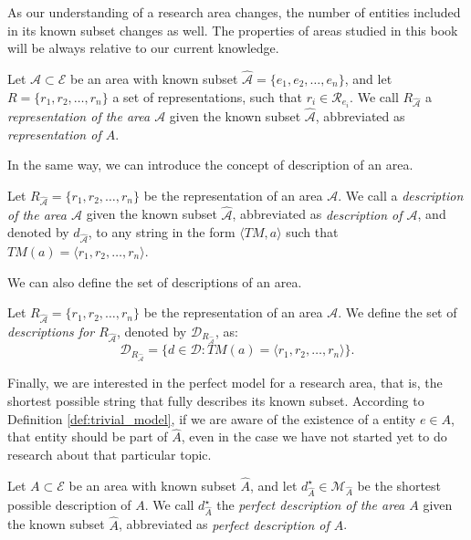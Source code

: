 As our understanding of a research area changes, the number of entities included in its known subset changes as well. The properties of areas studied in this book will be always relative to our current knowledge.

\begin{definition}
Let $\mathcal{A} \subset \mathcal{E}$ be an area with known subset $\hat{\mathcal{A}} = \{ e_1, e_2, \ldots, e_n \}$, and let  $R = \{ r_1, r_2, \ldots, r_n \}$ a set of representations, such that $r_i \in \mathcal{R}_{e_i}$. We call $R_{\hat{\mathcal{A}}}$ a \emph{representation of the area $\mathcal{A}$} given the known subset $\hat{\mathcal{A}}$, abbreviated as \emph{representation of $A$}.
\end{definition}

In the same way, we can introduce the concept of description of an area.

\begin{definition}
Let $R_{\hat{\mathcal{A}}} = \{ r_1, r_2, \ldots, r_n \}$ be the representation of an area $\mathcal{A}$. We call a \emph{description of the area $\mathcal{A}$} given the known subset $\hat{\mathcal{A}}$, abbreviated as \emph{description of $\mathcal{A}$}, and denoted by $d_{\hat{\mathcal{A}}}$, to any string in the form $\langle TM, a\rangle$ such that $TM(a) = \langle r_1, r_2, \ldots, r_n\rangle$.
\end{definition}

We can also define the set of descriptions of an area.

\begin{definition}
Let $R_{\hat{\mathcal{A}}} = \{ r_1, r_2, \ldots, r_n \}$ be the representation of an area $\mathcal{A}$. We define the set of \emph{descriptions for $R_{\hat{\mathcal{A}}}$}, denoted by $\mathcal{D}_{R_{\hat{\mathcal{A}}}}$, as:
\[
\mathcal{D}_{R_{\hat{\mathcal{A}}}} = \{ d \in \mathcal{D} : TM(a) = \langle r_1, r_2, \ldots, r_n\rangle \}.
\]
\end{definition}

Finally, we are interested in the perfect model for a research area, that is, the shortest possible string that fully describes its known subset. According to Definition \ref{def:trivial_model}, if we are aware of the existence of a entity $e \in A$, that entity should be part of $\hat{A}$, even in the case we have not started yet to do research about that particular topic.

\begin{definition}
Let $A \subset \mathcal{E}$ be an area with known subset $\hat{A}$, and let $d_{\hat{A}}^{\star} \in \mathcal{M}_{\hat{A}}$ be the shortest possible description of $A$. We call  $d_{\hat{A}}^{\star}$ the \emph{perfect description of the area $A$} given the known subset $\hat{A}$, abbreviated as \emph{perfect description of $A$}.
\end{definition}

